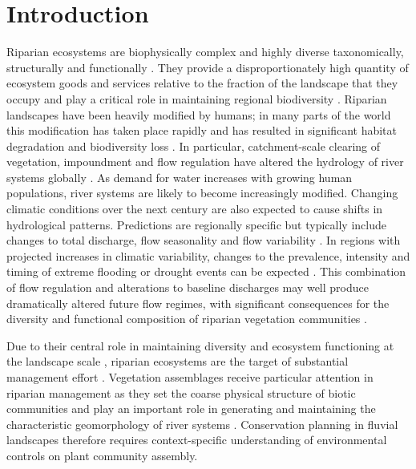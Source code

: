 \documentclass[openright,12pt,a4paper]{memoir}
\begin{document}
\doublespacing


\chapter[Introduction]{Introduction}
\newpage

Riparian ecosystems are biophysically complex and highly diverse taxonomically, structurally and functionally \cite{Naiman1993, Poff2002, Nilsson2002}. They provide a disproportionately high quantity of ecosystem goods and services relative to the fraction of the landscape that they occupy \cite{Capon2013} and play a critical role in maintaining regional biodiversity \cite{Naiman1993}. Riparian landscapes have been heavily modified by humans; in many parts of the world this modification has taken place rapidly and has resulted in significant habitat degradation and biodiversity loss \cite{Arthington2010}. In particular, catchment-scale clearing of vegetation, impoundment and flow regulation have altered the hydrology of river systems globally \cite{Nilsson2000}. As demand for water increases with growing human populations, river systems are likely to become increasingly modified. Changing climatic conditions over the next century are also expected to cause shifts in hydrological patterns. Predictions are regionally specific but typically include changes to total discharge, flow seasonality and flow variability \cite{stocker2013climate}. In regions with projected increases in climatic variability, changes to the prevalence, intensity and timing of extreme flooding or drought events can be expected \cite{Hennessy2008}. This combination of flow regulation and alterations to baseline discharges may well produce dramatically altered future flow regimes, with significant consequences for the diversity and functional composition of riparian vegetation communities \cite{Poff2010}. 

Due to their central role in maintaining diversity and ecosystem functioning at the landscape scale \cite{Naiman1993}, riparian ecosystems are the target of substantial management effort \cite{Goodwid1997}. Vegetation assemblages receive particular attention in riparian management as they set the coarse physical structure of biotic communities and play an important role in generating and maintaining the characteristic geomorphology of river systems \cite{Richardson2007, Corenblit2007}. Conservation planning in fluvial landscapes therefore requires context-specific understanding of environmental controls on plant community assembly. 
\end{document}
